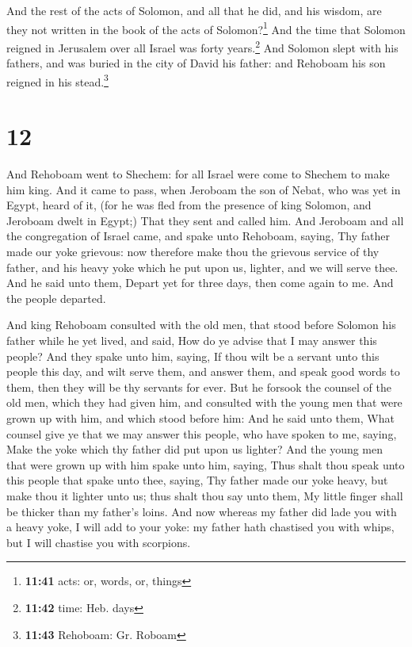  And the rest of the acts of Solomon, and all that he
did, and his wisdom, are they not written in the book of the acts of
Solomon?\footnote{\textbf{11:41} acts: or, words, or, things}
 And the time that Solomon reigned in Jerusalem over all
Israel was forty years.\footnote{\textbf{11:42} time: Heb. days}
 And Solomon slept with his fathers, and was buried in
the city of David his father: and Rehoboam his son reigned in his
stead.\footnote{\textbf{11:43} Rehoboam: Gr. Roboam}

\hypertarget{section-11}{%
\section{12}\label{section-11}}

 And Rehoboam went to Shechem: for all Israel were come to
Shechem to make him king.  And it came to pass, when
Jeroboam the son of Nebat, who was yet in Egypt, heard of it, (for he
was fled from the presence of king Solomon, and Jeroboam dwelt in
Egypt;)  That they sent and called him. And Jeroboam and
all the congregation of Israel came, and spake unto Rehoboam, saying,
 Thy father made our yoke grievous: now therefore make
thou the grievous service of thy father, and his heavy yoke which he put
upon us, lighter, and we will serve thee.  And he said
unto them, Depart yet for three days, then come again to me. And the
people departed.

 And king Rehoboam consulted with the old men, that stood
before Solomon his father while he yet lived, and said, How do ye advise
that I may answer this people?  And they spake unto him,
saying, If thou wilt be a servant unto this people this day, and wilt
serve them, and answer them, and speak good words to them, then they
will be thy servants for ever.  But he forsook the counsel
of the old men, which they had given him, and consulted with the young
men that were grown up with him, and which stood before him:
 And he said unto them, What counsel give ye that we may
answer this people, who have spoken to me, saying, Make the yoke which
thy father did put upon us lighter?  And the young men
that were grown up with him spake unto him, saying, Thus shalt thou
speak unto this people that spake unto thee, saying, Thy father made our
yoke heavy, but make thou it lighter unto us; thus shalt thou say unto
them, My little finger shall be thicker than my father's loins.
 And now whereas my father did lade you with a heavy
yoke, I will add to your yoke: my father hath chastised you with whips,
but I will chastise you with scorpions.

